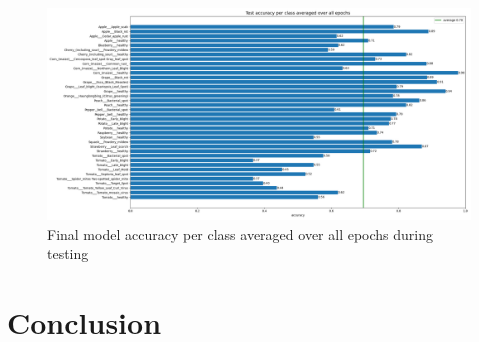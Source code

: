 \documentclass{BachelorBUI}
\begin{document}
        \begin{figure}[h]
            \centering
            \includegraphics[width=\textwidth]{final_test_accuracy_per_class_2024-11-25_11.16.14.png}
            \caption{\centering Final model accuracy per class averaged over all epochs during testing}
            \label{fig:final-test-accuracy-per-class}
        \end{figure}



\section{Conclusion}

\clearpage
\printbibliography
\end{document}
